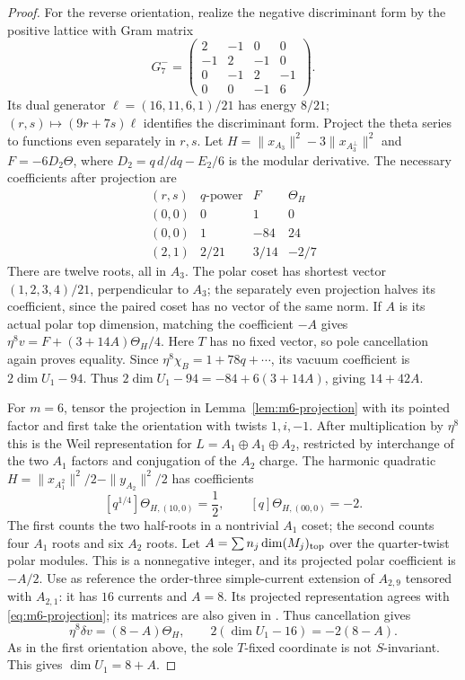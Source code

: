 \documentclass[11pt,a4paper]{article}
\theoremstyle{definition}
\begin{document}
\begin{proof}
For the reverse orientation, realize the negative discriminant form
by the positive lattice with Gram matrix
\[
 G_7^-=
 \begin{pmatrix}2&-1&0&0\\-1&2&-1&0\\
 0&-1&2&-1\\0&0&-1&6\end{pmatrix}.
\]
Its dual generator $\ell=(16,11,6,1)/21$ has energy $8/21$;
$(r,s)\mapsto(9r+7s)\ell$ identifies the discriminant form.
Project the theta series to functions even separately in $r,s$.
Let $H=\|x_{A_3}\|^2-3\|x_{A_3^\perp}\|^2$ and
$F=-6D_2\Theta$, where $D_2=q\,d/dq-E_2/6$ is the modular derivative.
The necessary coefficients after projection are
\[
\begin{array}{c|c|r|r}
 (r,s)&q\text{-power}&F&\Theta_H\\\hline
 (0,0)&0&1&0\\
 (0,0)&1&-84&24\\
 (2,1)&2/21&3/14&-2/7
\end{array}
\]
There are twelve roots, all in $A_3$. The polar coset has shortest
vector $(1,2,3,4)/21$, perpendicular to $A_3$; the separately even
projection halves its coefficient, since the paired coset has no
vector of the same norm. If $A$ is its actual polar top dimension,
matching the coefficient $-A$ gives
$\eta^8v=F+(3+14A)\Theta_H/4$. Here $T$ has no fixed vector, so
pole cancellation again proves equality. Since
$\eta^8\chi_B=1+78q+\cdots$, its vacuum coefficient is
$2\dim U_1-94$. Thus
$2\dim U_1-94=-84+6(3+14A)$, giving $14+42A$.

For $m=6$, tensor the projection in
Lemma~\ref{lem:m6-projection} with its pointed factor and first take
the orientation with twists $1,i,-1$. After multiplication by
$\eta^8$ this is the Weil representation for
$L=A_1\oplus A_1\oplus A_2$, restricted by interchange of the two
$A_1$ factors and conjugation of the $A_2$ charge.
The harmonic quadratic
$H=\|x_{A_1^2}\|^2/2-\|y_{A_2}\|^2/2$ has coefficients
\[
 [q^{1/4}]\Theta_{H,(10,0)}=\frac12,
 \qquad [q]\Theta_{H,(00,0)}=-2.
\]
The first counts the two half-roots in a nontrivial $A_1$ coset;
the second counts four $A_1$ roots and six $A_2$ roots.
Let $A=\sum n_j\dim(M_j)_{\rm top}$ over the quarter-twist polar
modules. This is a nonnegative integer, and its projected polar
coefficient is $-A/2$. Use as reference the order-three simple-current
extension of $A_{2,9}$ tensored with $A_{2,1}$: it has $16$ currents
and $A=8$. Its projected representation agrees with
\eqref{eq:m6-projection}; its matrices are also given in
\cite[Lemma~3.4 and Proposition~3.5]{Yu}. Thus cancellation gives
\[
 \eta^8\delta v=(8-A)\Theta_H,
 \qquad 2(\dim U_1-16)=-2(8-A).
\]
As in the first orientation above, the sole $T$-fixed coordinate is
not $S$-invariant. This gives $\dim U_1=8+A$.


\end{proof}
\end{document}
